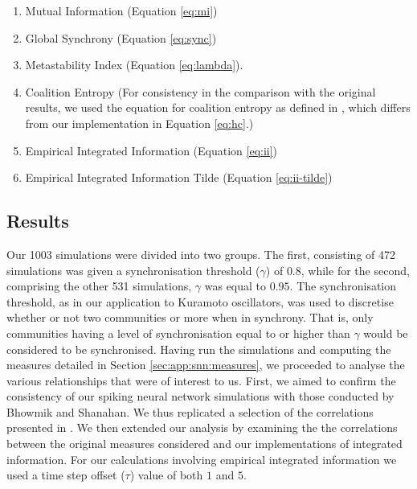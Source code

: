 \documentclass[a4paper,11pt]{article}
\begin{document}
\begin{enumerate}
\item{Mutual Information (Equation \ref{eq:mi})}
\item{Global Synchrony (Equation \ref{eq:sync})}
\item{Metastability Index (Equation \ref{eq:lambda})}.
\item{Coalition Entropy (For consistency in the comparison with the original results, we used the equation for coalition entropy as defined in \cite{Bhowmik2013}, which differs from our implementation in Equation \ref{eq:hc}.)}
\item{Empirical Integrated Information (Equation \ref{eq:ii})}
\item{Empirical Integrated Information Tilde (Equation \ref{eq:ii-tilde})}
\end{enumerate}

\subsection{Results}
\label{sec:snn:res}

Our 1003 simulations were divided into two groups. The first, consisting of 472 simulations was given a synchronisation threshold ($\gamma$) of $0.8$, while for the second, comprising the other 531 simulations, $\gamma$ was equal to $0.95$. The synchronisation threshold, as in our application to Kuramoto oscillators, was used to discretise whether or not two communities or more when in synchrony. That is, only communities having a level of synchronisation equal to or higher than $\gamma$ would be considered to be synchronised. Having run the simulations and computing the measures detailed in Section \ref{sec:app:snn:measures}, we proceeded to analyse the various relationships that were of interest to us. First, we aimed to confirm the consistency of our spiking neural network simulations with those conducted by Bhowmik and Shanahan. We thus replicated a selection of the correlations presented in \cite{Bhowmik2013}. We then extended our analysis by examining the the correlations between the original measures considered and our implementations of integrated information. For our calculations involving empirical integrated information we used a time step offset ($\tau$) value of both $1$ and $5$.
\end{document}
